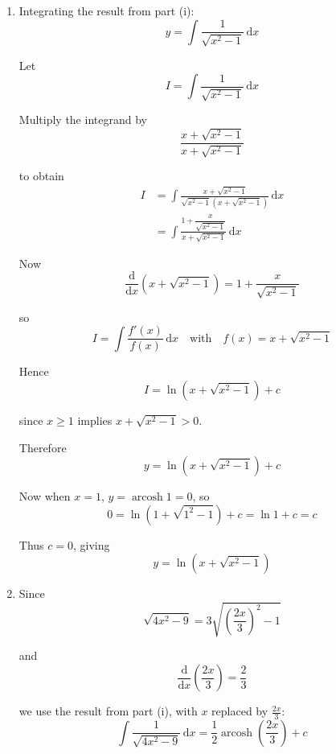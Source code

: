 \documentclass[leqno]{article}
\begin{document}
\begin{enumerate}[
  label=\textbf{\arabic*.},
  leftmargin=*,
  topsep=0pt,
  partopsep=0pt,
  parsep=0pt
]
\begin{djsSolution}
\begin{enumerate}[label=\textbf{(\roman*)}]
Differentiate implicitly with respect to \(x\):
\[
\sinh y\frac{\mathrm{d}y}{\mathrm{d}x}=1
\]

So
\[
\frac{\mathrm{d}y}{\mathrm{d}x}=\frac{1}{\sinh y}
\]

Using the identity
\[
\cosh^2 y-\sinh^2 y=1
\]

gives
\[
\sinh^2 y=\cosh^2 y-1=x^2-1
\]

Also \(y=\operatorname{arcosh}x\) with \(x\ge 1\), so \(y\ge 0\), hence \(\sinh y\ge 0\). Therefore
\[
\sinh y=\sqrt{x^2-1}
\]

and so
\[
\frac{\mathrm{d}y}{\mathrm{d}x}=\frac{1}{\sqrt{x^2-1}}
\]

as required.

\item Integrating the result from part (i):
\[
y=\int \frac{1}{\sqrt{x^2-1}}\,\mathrm{d}x
\]

Let
\[
I=\int \frac{1}{\sqrt{x^2-1}}\,\mathrm{d}x
\]

Multiply the integrand by
\[
\frac{x+\sqrt{x^2-1}}{x+\sqrt{x^2-1}}
\]

to obtain
\begin{align*}
I
&=\int \frac{x+\sqrt{x^2-1}}{\sqrt{x^2-1}\left(x+\sqrt{x^2-1}\right)}\,\mathrm{d}x \\
&=\int \frac{1+\dfrac{x}{\sqrt{x^2-1}}}{x+\sqrt{x^2-1}}\,\mathrm{d}x
\end{align*}

Now
\[
\frac{\mathrm{d}}{\mathrm{d}x}\!\left(x+\sqrt{x^2-1}\right)
=1+\frac{x}{\sqrt{x^2-1}}
\]

so
\[
I=\int \frac{f'(x)}{f(x)}\,\mathrm{d}x
\quad\text{with}\quad
f(x)=x+\sqrt{x^2-1}
\]

Hence
\[
I=\ln\left(x+\sqrt{x^2-1}\right)+c
\]

since \(x\ge 1\) implies \(x+\sqrt{x^2-1}>0\).

Therefore
\[
y=\ln\left(x+\sqrt{x^2-1}\right)+c
\]

Now when \(x=1\), \(y=\operatorname{arcosh}1=0\), so
\[
0=\ln\left(1+\sqrt{1^2-1}\right)+c=\ln 1+c=c
\]

Thus \(c=0\), giving
\[
y=\ln\left(x+\sqrt{x^2-1}\right)
\]

\item Since
\[
\sqrt{4x^2-9}=3\sqrt{\left(\frac{2x}{3}\right)^2-1}
\]

and
\[
\frac{\mathrm{d}}{\mathrm{d}x}\left(\frac{2x}{3}\right)=\frac23
\]

we use the result from part (i), with \(x\) replaced by \(\frac{2x}{3}\):
\[
\int \frac{1}{\sqrt{4x^2-9}}\,\mathrm{d}x
=
\frac12\operatorname{arcosh}\left(\frac{2x}{3}\right)+c
\]


\end{enumerate}
\end{djsSolution}
\end{enumerate}
\end{document}

